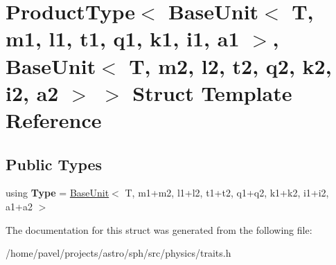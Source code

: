\hypertarget{structProductType_3_01BaseUnit_3_01T_00_01m1_00_01l1_00_01t1_00_01q1_00_01k1_00_01i1_00_01a1_01_ead4e8a75da6026c1b90792713ab6c32}{}\section{Product\+Type$<$ Base\+Unit$<$ T, m1, l1, t1, q1, k1, i1, a1 $>$, Base\+Unit$<$ T, m2, l2, t2, q2, k2, i2, a2 $>$ $>$ Struct Template Reference}
\label{structProductType_3_01BaseUnit_3_01T_00_01m1_00_01l1_00_01t1_00_01q1_00_01k1_00_01i1_00_01a1_01_ead4e8a75da6026c1b90792713ab6c32}
\subsection*{Public Types}
\begin{DoxyCompactItemize}
\item 
\hypertarget{structProductType_3_01BaseUnit_3_01T_00_01m1_00_01l1_00_01t1_00_01q1_00_01k1_00_01i1_00_01a1_01_ead4e8a75da6026c1b90792713ab6c32_a3389ccd998c8bd2f54dff6e00bc071df}{}\label{structProductType_3_01BaseUnit_3_01T_00_01m1_00_01l1_00_01t1_00_01q1_00_01k1_00_01i1_00_01a1_01_ead4e8a75da6026c1b90792713ab6c32_a3389ccd998c8bd2f54dff6e00bc071df} 
using {\bfseries Type} = \hyperlink{classBaseUnit}{Base\+Unit}$<$ T, m1+m2, l1+l2, t1+t2, q1+q2, k1+k2, i1+i2, a1+a2 $>$
\end{DoxyCompactItemize}


The documentation for this struct was generated from the following file\+:\begin{DoxyCompactItemize}
\item 
/home/pavel/projects/astro/sph/src/physics/traits.\+h\end{DoxyCompactItemize}
